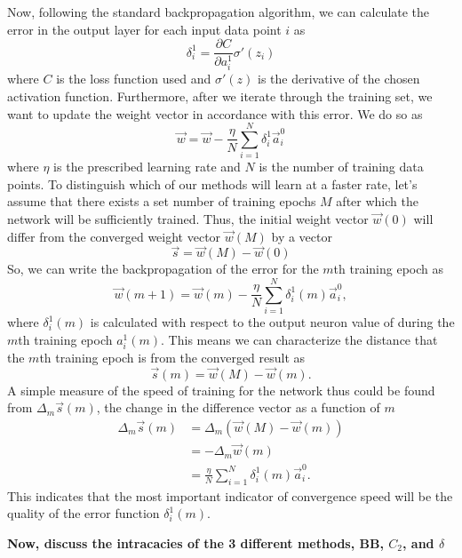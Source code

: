 Now, following the standard backpropagation algorithm, we can calculate the error in the output layer for each input data point $i$ as
\begin{equation}
\delta^{1}_i=\frac{\partial C}{\partial a^1_i}\sigma'(z_i)
\end{equation}
where $C$ is the loss function used and $\sigma'(z)$ is the derivative of the chosen activation function. Furthermore, after we iterate through the training set, we want to update the weight vector in accordance with this error. We do so as
\begin{equation}
\vec{w}=\vec{w}-\frac{\eta}{N}\sum_{i=1}^{N}\delta^{1}_{i}\vec{a}^0_i
\end{equation}
where $\eta$ is the prescribed learning rate and $N$ is the number of training data points. To distinguish which of our methods will learn at a faster rate, let's assume that there exists a set number of training epochs $M$ after which the network will be sufficiently trained. Thus, the initial weight vector $\vec{w}(0)$ will differ from the converged weight vector $\vec{w}(M)$ by a vector 
\begin{equation}
\vec{s}=\vec{w}(M)-\vec{w}(0)
\end{equation}
So, we can write the backpropagation of the error for the $m$th training epoch as
\begin{equation}
\label{w_m}
\vec{w}(m+1)=\vec{w}(m)-\frac{\eta}{N}\sum_{i=1}^{N}\delta^{1}_{i}(m)\vec{a}^0_i,
\end{equation}
where $\delta^{1}_{i}(m)$ is calculated with respect to the output neuron value of during the $m$th training epoch $a^1_i(m)$. This means we can characterize the distance that the $m$th training epoch is from the converged result as
\begin{equation}
\vec{s}(m)=\vec{w}(M)-\vec{w}(m).
\end{equation}
A simple measure of the speed of training for the network thus could be found from $\Delta_{m}\vec{s}(m)$, the change in the difference vector as a function of $m$
\begin{equation}
\begin{split}
\Delta_{m}\vec{s}(m)&=\Delta_{m}(\vec{w}(M)-\vec{w}(m))\\
&=-\Delta_{m}\vec{w}(m) \\
&=\frac{\eta}{N}\sum_{i=1}^{N}\delta^{1}_{i}(m)\vec{a}^0_i.
\end{split}
\end{equation}
This indicates that the most important indicator of convergence speed will be the quality of the error function $\delta^1_i(m)$.

{\bf Now, discuss the intracacies of the 3 different methods, BB, $C_2$, and $\delta$}